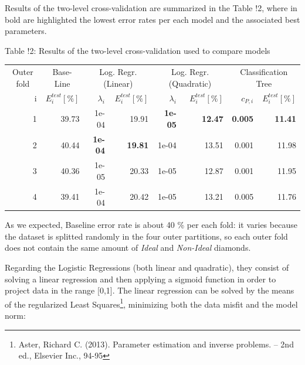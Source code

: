 \documentclass[
]{article}
\begin{document}
Results of the two-level cross-validation are summarized in the Table
!2, where in bold are highlighted the lowest error rates per each model
and the associated best parameters.

\begin{center} Table !2: Results of the two-level cross-validation used to compare models \end{center}

\begin{center}
\begin{tabular}{rrrrrrrr}
\toprule
\multicolumn{1}{c}{Outer fold} & \multicolumn{1}{c}{Base-Line} & \multicolumn{2}{c}{Log. Regr. (Linear)} & \multicolumn{2}{c}{Log. Regr. (Quadratic)} & \multicolumn{2}{c}{Classification Tree} \\
\cmidrule(l{3pt}r{3pt}){1-1} \cmidrule(l{3pt}r{3pt}){2-2} \cmidrule(l{3pt}r{3pt}){3-4} \cmidrule(l{3pt}r{3pt}){5-6} \cmidrule(l{3pt}r{3pt}){7-8}
i & {$E_i^{test} [\%]$} & {$\lambda_i$} & {$E_i^{test} [\%]$} & {$\lambda_i$} & {$E_i^{test} [\%]$} & {$c_{P,i}$} & {$E_i^{test} [\%]$}\\
\midrule
1 & 39.73 & 1e-04 & 19.91 & \textbf{1e-05} & \textbf{12.47} & \textbf{0.005} & \textbf{11.41}\\
2 & 40.44 & \textbf{1e-04} & \textbf{19.81} & 1e-04 & 13.51 & 0.001 & 11.98\\
3 & 40.36 & 1e-05 & 20.33 & 1e-05 & 12.87 & 0.001 & 11.95\\
4 & 39.41 & 1e-04 & 20.42 & 1e-05 & 13.21 & 0.005 & 11.76\\
\bottomrule
\end{tabular}
\end{center}

As we expected, Baseline error rate is about 40 \% per each fold: it
varies because the dataset is splitted randomly in the four outer
partitions, so each outer fold does not contain the same amount of
\emph{Ideal} and \emph{Non-Ideal} diamonds.

Regarding the Logistic Regressions (both linear and quadratic), they
consist of solving a linear regression and then applying a sigmoid
function in order to project data in the range {[}0,1{]}. The linear
regression can be solved by the means of the regularized Least
Squares\footnote{Aster, Richard C. (2013). Parameter estimation and
  inverse problems. -- 2nd ed., Elsevier Inc., 94-95}, minimizing both
the data misfit and the model norm:
\end{document}
